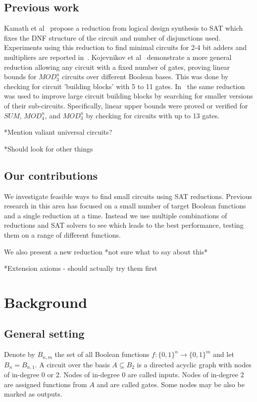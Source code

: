 \documentclass{article}
\begin{document}
\subsection{Previous work}

Kamath et al~\cite{kamath} propose a reduction from logical design synthesis to SAT which fixes the DNF structure of the circuit and number of disjunctions used. Experiments using this reduction to find minimal circuits for 2-4 bit adders and multipliers are reported in~\cite{estrada}. Kojevnikov et al~\cite{kulikov} demonstrate a more general reduction allowing any circuit with a fixed number of gates, proving linear bounds for \(MOD^n_3\) circuits over different Boolean bases. This was done by checking for circuit 'building blocks' with 5 to 11 gates. In~\cite{kulikovlocal} the same reduction was used to improve large circuit building blocks by searching for smaller versions of their sub-circuits. Specifically, linear upper bounds were proved or verified for \(SUM\), \(MOD^n_4\), and \(MOD^n_3\) by checking for circuits with up to 13 gates.

*Mention valiant universal circuits?

*Should look for other things

\subsection{Our contributions}

We investigate feasible ways to find small circuits using SAT reductions. Previous research in this area has focused on a small number of target Boolean functions and a single reduction at a time. Instead we use multiple combinations of reductions and SAT solvers to see which leads to the best performance, testing them on a range of different functions. 

We also present a new reduction *not sure what to say about this*

*Extension axioms - should actually try them first


\section{Background}

\subsection{General setting}

Denote by \(B_{n,m}\) the set of all Boolean functions \(f: \{0,1\}^n \to \{0,1\}^m\) and let \(B_n = B_{n,1}\). A circuit over the basis \(A \subseteq B_2\) is a directed acyclic graph with nodes of in-degree 0 or 2. Nodes of in-degree 0 are called inputs. Nodes of in-degree 2 are assigned functions from \(A\) and are called gates. Some nodes may be also be marked as outputs.
\end{document}
